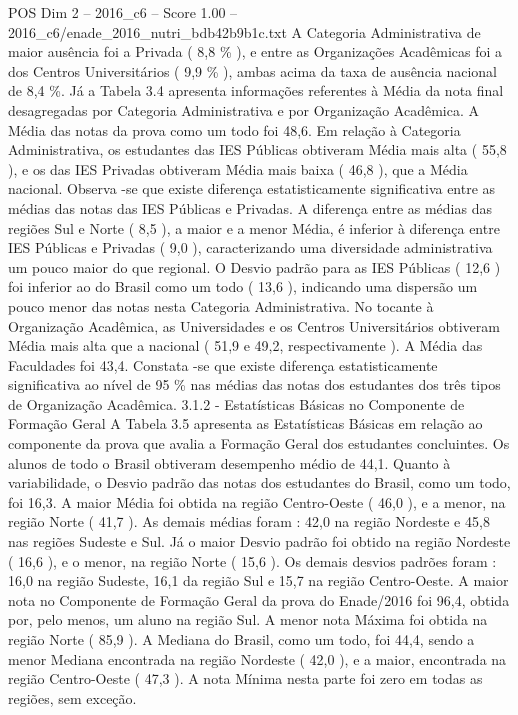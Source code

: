 \begin{textsample}{POS Dim 2 – 2016\_c6 – Score 1.00 – 2016\_c6/enade\_2016\_nutri\_bdb42b9b1c.txt}
A Categoria Administrativa de maior ausência foi a Privada ( 8,8 \% ), e entre as Organizações Acadêmicas foi a dos Centros Universitários ( 9,9 \% ), ambas acima da taxa de ausência nacional de 8,4 \%.
Já a Tabela 3.4 apresenta informações referentes à Média da nota final desagregadas por Categoria Administrativa e por Organização Acadêmica.
A Média das notas da prova como um todo foi 48,6.
Em relação à Categoria Administrativa, os estudantes das IES Públicas obtiveram Média mais alta ( 55,8 ), e os das IES Privadas obtiveram Média mais baixa ( 46,8 ), que a Média nacional.
Observa -se que existe diferença estatisticamente significativa entre as médias das notas das IES Públicas e Privadas.
A diferença entre as médias das regiões Sul e Norte ( 8,5 ), a maior e a menor Média, é inferior à diferença entre IES Públicas e Privadas ( 9,0 ), caracterizando uma diversidade administrativa um pouco maior do que regional.
O Desvio padrão para as IES Públicas ( 12,6 ) foi inferior ao do Brasil como um todo ( 13,6 ), indicando uma dispersão um pouco menor das notas nesta Categoria Administrativa.
No tocante à Organização Acadêmica, as Universidades e os Centros Universitários obtiveram Média mais alta que a nacional ( 51,9 e 49,2, respectivamente ).
A Média das Faculdades foi 43,4.
Constata -se que existe diferença estatisticamente significativa ao nível de 95 \% nas médias das notas dos estudantes dos três tipos de Organização Acadêmica. 3.1.2 - Estatísticas Básicas no Componente de Formação Geral A Tabela 3.5 apresenta as Estatísticas Básicas em relação ao componente da prova que avalia a Formação Geral dos estudantes concluintes.
Os alunos de todo o Brasil obtiveram desempenho médio de 44,1.
Quanto à variabilidade, o Desvio padrão das notas dos estudantes do Brasil, como um todo, foi 16,3.
A maior Média foi obtida na região Centro-Oeste ( 46,0 ), e a menor, na região Norte ( 41,7 ).
As demais médias foram : 42,0 na região Nordeste e 45,8 nas regiões Sudeste e Sul.
Já o maior Desvio padrão foi obtido na região Nordeste ( 16,6 ), e o menor, na região Norte ( 15,6 ).
Os demais desvios padrões foram : 16,0 na região Sudeste, 16,1 da região Sul e 15,7 na região Centro-Oeste.
A maior nota no Componente de Formação Geral da prova do Enade/2016 foi 96,4, obtida por, pelo menos, um aluno na região Sul.
A menor nota Máxima foi obtida na região Norte ( 85,9 ).
A Mediana do Brasil, como um todo, foi 44,4, sendo a menor Mediana encontrada na região Nordeste ( 42,0 ), e a maior, encontrada na região Centro-Oeste ( 47,3 ).
A nota Mínima nesta parte foi zero em todas as regiões, sem exceção.

\end{textsample}
